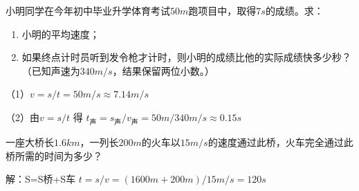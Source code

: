 \documentclass[12pt,twoside]{exam}
\begin{document}
\begin{Aquestions}
\begin{questions}
\question
小明同学在今年初中毕业升学体育考试$50m$跑项目中，取得$7s$的成绩。求：
\begin{enumerate}
\item 小明的平均速度；
\item 如果终点计时员听到发令枪才计时，则小明的成绩比他的实际成绩快多少秒？（已知声速为$340m/s$，结果保留两位小数。）
\end{enumerate}

\begin{solution}[10ex]
（1）$v=s/t=50m/s \approx 7.14m/s $

（2）由$v=s/t$ 得 $t_ \textrm{声}=s_\textrm{声}/v_\textrm{声}=50m/340m/s \approx 0.15s$
\end{solution}


\question
一座大桥长$1.6km$，一列长$200m$的火车以$15m/s$的速度通过此桥，火车完全通过此桥所需的时间为多少？

\begin{solution}[8ex]
解：S=S桥+S车      $t=s/v=(1600m+200m)/15m/s=120s$
\end{solution}

\end{questions}
\end{Aquestions}
\end{document}
